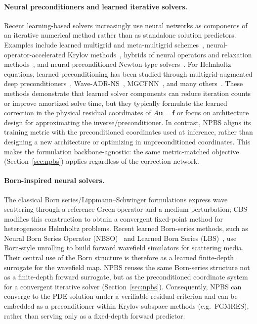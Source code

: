\documentclass{article}
\theoremstyle{plain}
\theoremstyle{remark}
\begin{document}
\paragraph{Neural preconditioners and learned iterative solvers.}
Recent learning-based solvers increasingly use neural networks as components of an iterative numerical method rather than as standalone solution predictors. Examples include learned multigrid and meta-multigrid schemes~\cite{greenfeld2019learning,chen2022meta}, neural-operator-accelerated Krylov methods~\cite{rudikov2024neural,kopanivcakova2025leveraging}, hybrids of neural operators and relaxation methods~\cite{zhang2024blending,lee2025hybrid}, and neural preconditioned Newton-type solvers~\cite{lee2025neural}. For Helmholtz equations, learned preconditioning has been studied through multigrid-augmented deep preconditioners~\cite{azulay2022multigrid,lerer2024multigrid}, Wave-ADR-NS~\cite{cui2025neural}, MGCFNN~\cite{xie2025mgcfnn}, and many others~\cite{stanziola2021helmholtz,lee2025fast}. These methods demonstrate that learned solver components can reduce iteration counts or improve amortized solve time, but they typically formulate the learned correction in the physical residual coordinates of $A\bm u=\bm f$ or focus on architecture design for approximating the inverse/preconditioner. 
In contrast, NPBS aligns its training metric with the preconditioned coordinates used at inference, rather than designing a new architecture or optimizing in unpreconditioned coordinates. This makes the formulation backbone-agnostic: the same metric-matched objective (Section~\ref{sec:npbs}) applies regardless of the correction network.

\paragraph{Born-inspired neural solvers.}
The classical Born series/Lippmann--Schwinger formulations express wave scattering through a reference Green operator and a medium perturbation; CBS~\cite{osnabrugge2016convergent} modifies this construction to obtain a convergent fixed-point method for heterogeneous Helmholtz problems. Recent learned Born-series methods, such as Neural Born Series Operator (NBSO)~\cite{zeng2023neural} and Learned Born Series (LBS)~\cite{stanziola2024learned}, use Born-style unrolling to build forward wavefield simulators for scattering media. Their central use of the Born structure is therefore as a learned finite-depth surrogate for the wavefield map. NPBS reuses the same Born-series structure not as a finite-depth forward surrogate, but as the preconditioned coordinate system for a convergent iterative solver (Section~\ref{sec:npbs}).
Consequently, NPBS can converge to the PDE solution under a verifiable residual criterion and can be embedded as a preconditioner within Krylov subspace methods (e.g.\ FGMRES), rather than serving only as a fixed-depth forward predictor.
\end{document}
